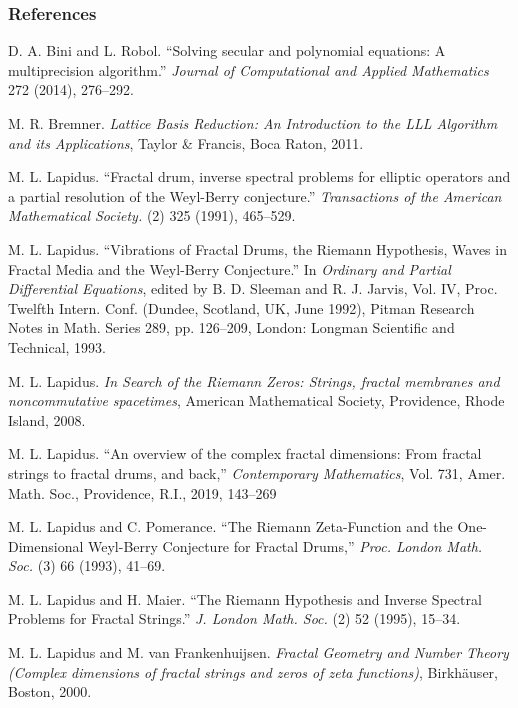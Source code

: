 \documentclass{if-beamer}
\begin{document}
\begin{frame}[allowframebreaks]
\frametitle{References}

\begin{thebibliography}{1}

D. A. Bini and L. Robol.
``Solving secular and polynomial equations: A multiprecision algorithm.'' 
\textit{Journal of Computational and Applied Mathematics}
272
(2014),
276--292.

M. R. Bremner.
\textit{Lattice Basis Reduction: An Introduction to the LLL Algorithm and its Applications},
Taylor \& Francis, Boca Raton, 2011.

M. L. Lapidus.
``Fractal drum, inverse spectral problems for elliptic operators and a partial resolution of the Weyl-Berry conjecture.'' 
\textit{Transactions of the American Mathematical Society.}
(2)
325
(1991),
465--529.
 
M. L. Lapidus.
``Vibrations of Fractal Drums, the Riemann Hypothesis, Waves in Fractal Media and the Weyl-Berry Conjecture.'' In \textit{Ordinary and Partial Differential Equations}, edited by B. D. Sleeman and R. J. Jarvis, Vol. IV, Proc. Twelfth Intern. Conf. (Dundee, Scotland, UK, June 1992), Pitman Research Notes in Math. Series 289, pp. 126--209, London: Longman Scientific and Technical, 1993.

M. L. Lapidus.
\textit{In Search of the Riemann Zeros: Strings, fractal membranes and noncommutative spacetimes}, 
American Mathematical Society, Providence, Rhode Island, 2008.

M. L. Lapidus.
``An overview of the complex fractal dimensions: From fractal strings to fractal drums, and back,'' \textit{Contemporary Mathematics}, Vol. 731, Amer. Math. Soc., Providence, R.I., 2019, 143--269

M. L. Lapidus and C. Pomerance.
``The Riemann Zeta-Function and the One-Dimensional Weyl-Berry Conjecture for Fractal Drums,''
\textit{Proc. London Math. Soc.}
(3)
66
(1993),
41--69.

M. L. Lapidus and H. Maier.
``The Riemann Hypothesis and Inverse Spectral Problems for Fractal Strings.'' \textit{J. London Math. Soc.}
(2)
52
(1995),
15--34.

M. L. Lapidus and M. van Frankenhuijsen.
\textit{Fractal Geometry and Number Theory \textup(Complex dimensions of fractal strings and zeros of zeta functions\textup)},
Birkh\"auser, Boston, 2000.


\end{thebibliography}
\end{frame}
\end{document}
